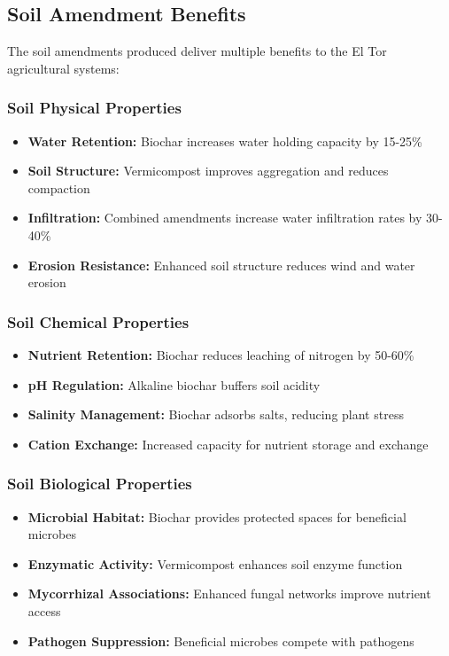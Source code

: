 \subsection{Soil Amendment Benefits}

The soil amendments produced deliver multiple benefits to the El Tor agricultural systems:

\subsubsection{Soil Physical Properties}
\begin{itemize}
    \item \textbf{Water Retention:} Biochar increases water holding capacity by 15-25\%
    \item \textbf{Soil Structure:} Vermicompost improves aggregation and reduces compaction
    \item \textbf{Infiltration:} Combined amendments increase water infiltration rates by 30-40\%
    \item \textbf{Erosion Resistance:} Enhanced soil structure reduces wind and water erosion
\end{itemize}

\subsubsection{Soil Chemical Properties}
\begin{itemize}
    \item \textbf{Nutrient Retention:} Biochar reduces leaching of nitrogen by 50-60\%
    \item \textbf{pH Regulation:} Alkaline biochar buffers soil acidity
    \item \textbf{Salinity Management:} Biochar adsorbs salts, reducing plant stress
    \item \textbf{Cation Exchange:} Increased capacity for nutrient storage and exchange
\end{itemize}

\subsubsection{Soil Biological Properties}
\begin{itemize}
    \item \textbf{Microbial Habitat:} Biochar provides protected spaces for beneficial microbes
    \item \textbf{Enzymatic Activity:} Vermicompost enhances soil enzyme function
    \item \textbf{Mycorrhizal Associations:} Enhanced fungal networks improve nutrient access
    \item \textbf{Pathogen Suppression:} Beneficial microbes compete with pathogens
\end{itemize}

